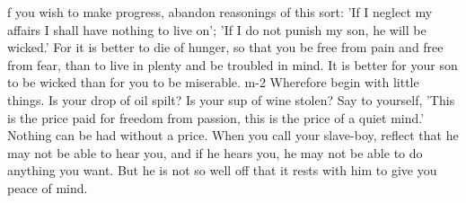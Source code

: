 f you wish to make progress, abandon  reasonings of this sort: 'If I neglect my
affairs I shall have  nothing to live on'; 'If I do not  punish my son, he will
be wicked.' For  it is better to die  of hunger, so that you be  free from pain
and free  from fear,  than to live  in plenty  and be troubled  in mind.  It is
better for your  son to be wicked  than for you to be  miserable. m-2 Wherefore
begin  with little  things. Is  your drop  of oil  spilt? Is  your sup  of wine
stolen? Say to yourself, 'This is the price paid for freedom from passion, this
is the  price of a quiet  mind.' Nothing can be  had without a price.  When you
call your  slave-boy, reflect that he  may not be able  to hear you, and  if he
hears you, he  may not be able to do  anything you want. But he is  not so well
off that it rests with him to give you peace of mind.
